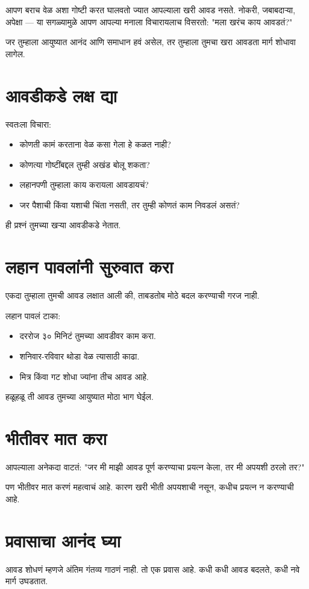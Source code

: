 आपण बराच वेळ अशा गोष्टी करत घालवतो  
ज्यात आपल्याला खरी आवड नसते.  
नोकरी, जबाबदाऱ्या, अपेक्षा —  
या सगळ्यामुळे आपण आपल्या मनाला विचारायलाच विसरतो:  
"मला खरंच काय आवडतं?"  

जर तुम्हाला आयुष्यात आनंद आणि समाधान हवं असेल,  
तर तुम्हाला तुमचा खरा आवडता मार्ग शोधावा लागेल.  

\section*{आवडीकडे लक्ष द्या}
स्वतःला विचारा:  
\begin{itemize}
\item कोणती कामं करताना वेळ कसा गेला हे कळत नाही?  
\item कोणत्या गोष्टींबद्दल तुम्ही अखंड बोलू शकता?  
\item लहानपणी तुम्हाला काय करायला आवडायचं?  
\item जर पैशाची किंवा यशाची चिंता नसती,  
तर तुम्ही कोणतं काम निवडलं असतं?  
\end{itemize}

ही प्रश्नं तुमच्या खऱ्या आवडीकडे नेतात.  

\section*{लहान पावलांनी सुरुवात करा}
एकदा तुम्हाला तुमची आवड लक्षात आली की,  
ताबडतोब मोठे बदल करण्याची गरज नाही.  

लहान पावलं टाका:  
\begin{itemize}
\item दररोज ३० मिनिटं तुमच्या आवडीवर काम करा.  
\item शनिवार-रविवार थोडा वेळ त्यासाठी काढा.  
\item मित्र किंवा गट शोधा ज्यांना तीच आवड आहे.  
\end{itemize}

हळूहळू ती आवड तुमच्या आयुष्यात मोठा भाग घेईल.  

\section*{भीतीवर मात करा}
आपल्याला अनेकदा वाटतं:  
"जर मी माझी आवड पूर्ण करण्याचा प्रयत्न केला,  
तर मी अपयशी ठरलो तर?"  

पण भीतीवर मात करणं महत्वाचं आहे.  
कारण खरी भीती अपयशाची नसून,  
कधीच प्रयत्न न करण्याची आहे.  

\section*{प्रवासाचा आनंद घ्या}
आवड शोधणं म्हणजे अंतिम गंतव्य गाठणं नाही.  
तो एक प्रवास आहे.  
कधी कधी आवड बदलते,  
कधी नवे मार्ग उघडतात.  

